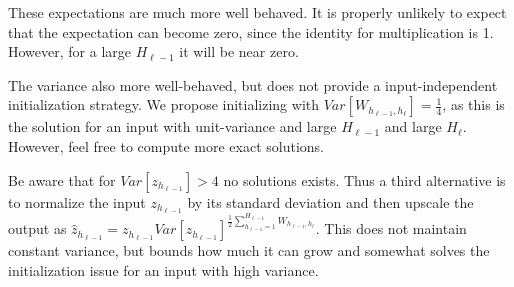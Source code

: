 These expectations are much more well behaved. It is properly unlikely to expect that the expectation can become zero, since the identity for multiplication is 1. However, for a large $H_{\ell-1}$ it will be near zero.

The variance also more well-behaved, but does not provide a input-independent initialization strategy. We propose initializing with $Var[W_{h_{\ell-1},h_\ell}] = \frac{1}{4}$, as this is the solution for an input with unit-variance and large $H_{\ell-1}$ and large $H_{\ell}$. However, feel free to compute more exact solutions.

Be aware that for $Var[z_{h_{\ell-1}}] > 4$ no solutions exists. Thus a third alternative is to normalize the input $z_{h_{\ell-1}}$ by its standard deviation and then upscale the output as $\hat{z}_{h_{\ell-1}} = z_{h_{\ell-1}} Var[z_{h_{\ell-1}}]^{\frac{1}{2} \sum_{h_{\ell-1} = 1}^{H_{\ell-1}} W_{h_{\ell-1}, h_\ell}}$. This does not maintain constant variance, but bounds how much it can grow and somewhat solves the initialization issue for an input with high variance.
